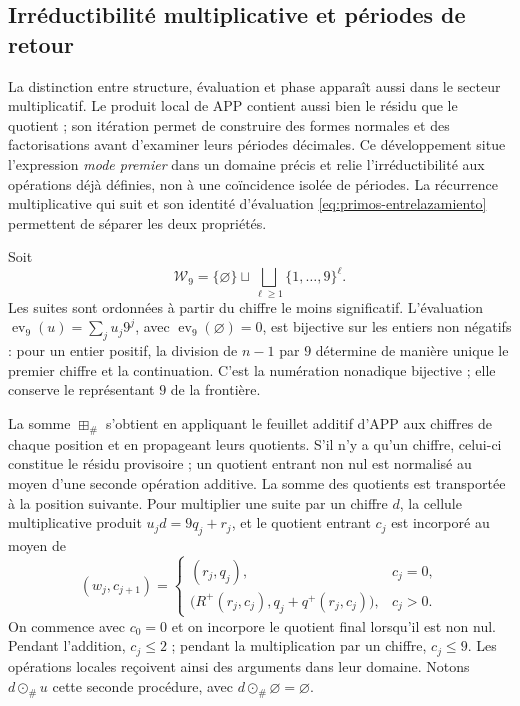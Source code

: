 \subsection{Irréductibilité multiplicative et périodes de retour}
\label{primos-retornos}

La distinction entre structure, évaluation et phase apparaît aussi dans le
secteur multiplicatif. Le produit local de APP contient aussi bien le résidu
que le quotient ; son itération permet de construire des formes normales et
des factorisations avant d’examiner leurs périodes décimales. Ce développement
situe l’expression \emph{mode premier} dans un domaine précis et relie
l’irréductibilité aux opérations déjà définies, non à une coïncidence
isolée de périodes. La récurrence multiplicative qui suit et
son identité d’évaluation \eqref{eq:primos-entrelazamiento}
permettent de séparer les deux propriétés.

Soit
\[
 \mathcal W_9=\{\varnothing\}\sqcup
 \bigsqcup_{\ell\geq1}\{1,\ldots,9\}^{\ell}.
\]
Les suites sont ordonnées à partir du chiffre le moins significatif. L'évaluation
\(\operatorname{ev}_9(u)=\sum_j u_j9^j\), avec
\(\operatorname{ev}_9(\varnothing)=0\), est bijective sur les entiers non
négatifs : pour un entier positif, la division de \(n-1\) par \(9\)
détermine de manière unique le premier chiffre et la continuation. C'est la
numération nonadique bijective ; elle conserve le représentant \(9\) de la
frontière.

La somme \(\boxplus_\#\) s'obtient en appliquant le feuillet additif d'APP aux chiffres de chaque position et en propageant leurs quotients. S'il n'y a qu'un chiffre, celui-ci constitue le résidu provisoire ; un quotient entrant non nul est normalisé au moyen d'une seconde opération additive. La somme des quotients est transportée à la position suivante. Pour multiplier une suite par un chiffre \(d\), la cellule multiplicative produit \(u_jd=9q_j+r_j\), et le quotient entrant \(c_j\) est incorporé au moyen de
\[
 (w_j,c_{j+1})=
 \begin{cases}
 (r_j,q_j),&c_j=0,\\
 \bigl(R^+(r_j,c_j),q_j+q^+(r_j,c_j)\bigr),&c_j>0.
 \end{cases}
\]
On commence avec \(c_0=0\) et on incorpore le quotient final lorsqu'il est non
nul. Pendant l'addition, \(c_j\leq2\) ; pendant la multiplication par un chiffre,
\(c_j\leq9\). Les opérations locales reçoivent ainsi des arguments dans
leur domaine. Notons \(d\odot_\#u\) cette seconde procédure,
avec \(d\odot_\#\varnothing=\varnothing\).

